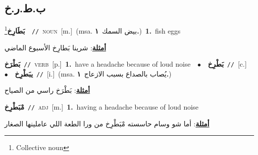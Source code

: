 \documentclass[10pt,a4paper,twoside]{article} %
\begin{document}
\begin{multicols}{2}
\vspace{-3mm}
\subsection*{\color{blue}\foreignlanguage{arabic}{ب.ط.ر.خ}\color{blue}{}} 

{\setlength\topsep{0pt}\textbf{\foreignlanguage{arabic}{بَطَارِخ}}\footnote{Collective noun}\ \ {\color{gray}\texttt{//}\color{black}}\ \textsc{noun}\ [m.]\ \color{gray}(msa. \foreignlanguage{arabic}{بيض السمك}~\foreignlanguage{arabic}{\textbf{١.}})\color{black}\ \textbf{1.}~fish eggs\  \begin{flushright}\color{gray}\foreignlanguage{arabic}{\textbf{\underline{\foreignlanguage{arabic}{أمثلة}}}: شرينا بَطارِخ الأسبوع الماضي}\end{flushright}\color{black}} \vspace{2mm}

{\setlength\topsep{0pt}\textbf{\foreignlanguage{arabic}{بَطْرَخ}}\ {\color{gray}\texttt{//}\color{black}}\ \textsc{verb}\ [p.]\ \textbf{1.}~have a headache because of loud noise\ \ $\bullet$\ \ \setlength\topsep{0pt}\textbf{\foreignlanguage{arabic}{بَطْرِخ}}\ {\color{gray}\texttt{//}\color{black}}\ [c.]\ \ $\bullet$\ \ \setlength\topsep{0pt}\textbf{\foreignlanguage{arabic}{يبَطْرِخ}}\ {\color{gray}\texttt{//}\color{black}}\ [i.]\ \color{gray}(msa. \foreignlanguage{arabic}{يُصاب بالصداع بسبب الازعاج}~\foreignlanguage{arabic}{\textbf{١.}})\color{black}\  \begin{flushright}\color{gray}\foreignlanguage{arabic}{\textbf{\underline{\foreignlanguage{arabic}{أمثلة}}}: بَطْرَخ راسي من الصياح}\end{flushright}\color{black}} \vspace{2mm}

{\setlength\topsep{0pt}\textbf{\foreignlanguage{arabic}{مْبَطْرِخ}}\ {\color{gray}\texttt{//}\color{black}}\ \textsc{adj}\ [m.]\ \textbf{1.}~having a headache because of loud noise\  \begin{flushright}\color{gray}\foreignlanguage{arabic}{\textbf{\underline{\foreignlanguage{arabic}{أمثلة}}}: أما شو وسام حاسسته مْبَطْرِخ من ورا الطعة اللي عاملينها الصغار}\end{flushright}\color{black}} \vspace{2mm}


\end{multicols}
\end{document}
